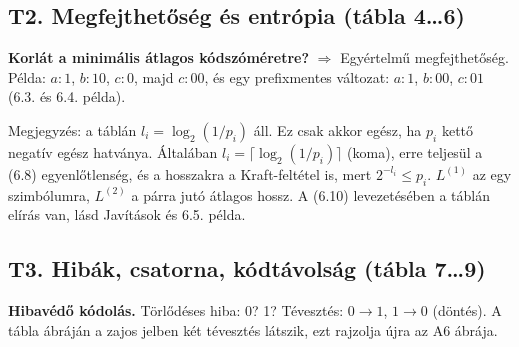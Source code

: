 \subsection{\texorpdfstring{T2. Megfejthetőség és entrópia (tábla 4\ldots{}6)}{T2. Megfejthetőség és entrópia (tábla 4…6)}}\label{e6-megfejt}
\textbf{Korlát a minimális átlagos kódszóméretre?} $\Rightarrow$ Egyértelmű megfejthetőség. Példa: $a:1$, $b:10$, $c:0$, majd $c:00$, és egy prefixmentes változat: $a:1$, $b:00$, $c:01$ (6.3. és 6.4. példa).

\par{}\par

Megjegyzés: a táblán $l_i=\log_2(1/p_i)$ áll. Ez csak akkor egész, ha $p_i$ kettő negatív egész hatványa. Általában $l_i=\lceil\log_2(1/p_i)\rceil$ (koma), erre teljesül a (6.8) egyenlőtlenség, és a hosszakra a Kraft-feltétel is, mert $2^{-l_i}\le p_i$. $L^{(1)}$ az egy szimbólumra, $L^{(2)}$ a párra jutó átlagos hossz. A (6.10) levezetésében a táblán elírás van, lásd Javítások és 6.5. példa.

\subsection{\texorpdfstring{T3. Hibák, csatorna, kódtávolság (tábla 7\ldots{}9)}{T3. Hibák, csatorna, kódtávolság (tábla 7…9)}}\label{e6-hiba}
\textbf{Hibavédő kódolás.} Törlődéses hiba: 0? 1? Tévesztés: $0\to1$, $1\to0$ (döntés). A tábla ábráján a zajos jelben két tévesztés látszik, ezt rajzolja újra az A6 ábrája.

